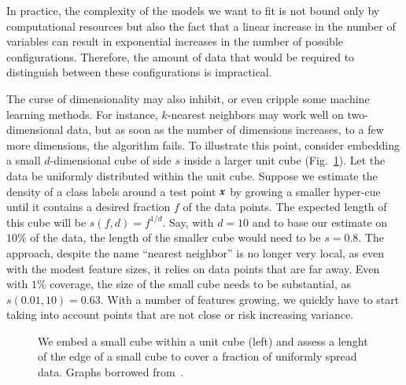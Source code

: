 \begin{refsection}
In practice, the complexity of the models we want to fit is not bound only by computational resources but also the fact that a linear increase in the number of variables can result in exponential increases in the number of possible configurations. Therefore, the amount of data that would be required to distinguish between these configurations is impractical. 

The curse of dimensionality may also inhibit, or even cripple some machine learning methods. For instance, $k$-nearest neighbors may work well on two-dimensional data, but as soon as the number of dimensions increases, to a few more dimensions, the algorithm fails. To illustrate this point, consider embedding a small $d$-dimensional cube of side $s$ inside a larger unit cube (Fig.~\ref{fig:cube-in-cube}). Let the data be uniformly distributed within the unit cube. Suppose we estimate the density of a class labels around a test point $\boldsymbol{x}$ by growing a smaller hyper-cue until it contains a desired fraction $f$ of the data points. The expected length of this cube will be $s(f,d)=f^{1/d}$. Say, with $d=10$ and to base our estimate on $10\%$ of the data, the length of the smaller cube would need to be $s=0.8$. The approach, despite the name ``nearest neighbor'' is no longer very local, as even with the modest feature sizes, it relies on data points that are far away. Even with $1\%$ coverage, the size of the small cube needs to be substantial, as $s(0.01,10)=0.63$. With a number of features growing, we quickly have to start taking into account points that are not close or risk increasing variance.

\begin{figure}[htbp]
\caption{We embed a small cube within a unit cube (left) and assess a lenght of the edge of a small cube to cover a fraction of uniformly spread data. Graphs borrowed from~\citet{2012-Murphy}.}
\label{fig:cube-in-cube}
\end{figure}


\printbibliography[heading=subbibliography]
\end{refsection}